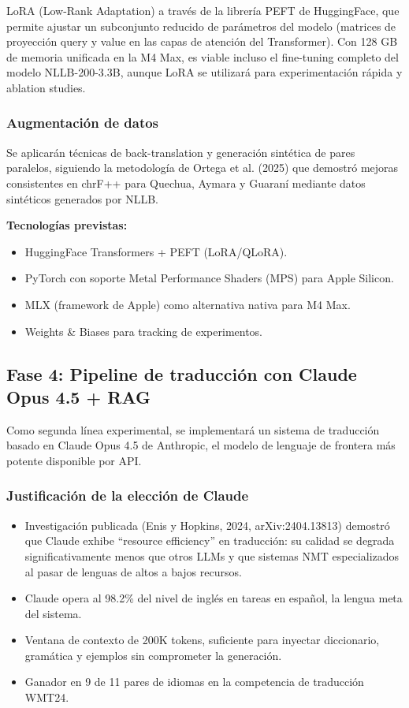 \documentclass[12pt,a4paper]{article}
\begin{document}
LoRA (Low-Rank Adaptation) a través de la librería PEFT de HuggingFace, que permite ajustar un subconjunto reducido de parámetros del modelo (matrices de proyección query y value en las capas de atención del Transformer). Con 128 GB de memoria unificada en la M4 Max, es viable incluso el fine-tuning completo del modelo NLLB-200-3.3B, aunque LoRA se utilizará para experimentación rápida y ablation studies.

\subsubsection{Augmentación de datos}

Se aplicarán técnicas de back-translation y generación sintética de pares paralelos, siguiendo la metodología de Ortega et al. (2025) que demostró mejoras consistentes en chrF++ para Quechua, Aymara y Guaraní mediante datos sintéticos generados por NLLB.

\textbf{Tecnologías previstas:}
\begin{itemize}
    \item HuggingFace Transformers + PEFT (LoRA/QLoRA).
    \item PyTorch con soporte Metal Performance Shaders (MPS) para Apple Silicon.
    \item MLX (framework de Apple) como alternativa nativa para M4 Max.
    \item Weights \& Biases para tracking de experimentos.
\end{itemize}

\subsection{Fase 4: Pipeline de traducción con Claude Opus 4.5 + RAG}

Como segunda línea experimental, se implementará un sistema de traducción basado en Claude Opus 4.5 de Anthropic, el modelo de lenguaje de frontera más potente disponible por API.

\subsubsection{Justificación de la elección de Claude}

\begin{itemize}
    \item Investigación publicada (Enis y Hopkins, 2024, arXiv:2404.13813) demostró que Claude exhibe ``resource efficiency'' en traducción: su calidad se degrada significativamente menos que otros LLMs y que sistemas NMT especializados al pasar de lenguas de altos a bajos recursos.
    \item Claude opera al 98.2\% del nivel de inglés en tareas en español, la lengua meta del sistema.
    \item Ventana de contexto de 200K tokens, suficiente para inyectar diccionario, gramática y ejemplos sin comprometer la generación.
    \item Ganador en 9 de 11 pares de idiomas en la competencia de traducción WMT24.
\end{itemize}
\end{document}
